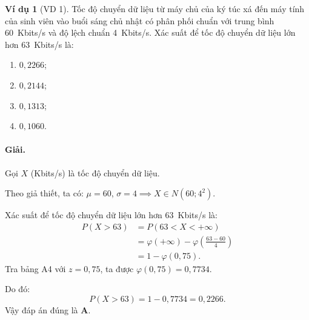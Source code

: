 \documentclass[12pt,a4paper]{article}
\theoremstyle{definition}
\newtheorem{vidu}{Ví dụ}[section]
\begin{document}
\begin{vidu}[VD 1]
Tốc độ chuyển dữ liệu từ máy chủ của ký túc xá đến máy tính của sinh viên vào buổi sáng chủ nhật có phân phối chuẩn với trung bình 60~Kbits/s và độ lệch chuẩn 4~Kbits/s. Xác suất để tốc độ chuyển dữ liệu lớn hơn 63~Kbits/s là:
\begin{enumerate}[label=\Alph*.]
    \item $0{,}2266$;
    \item $0{,}2144$;
    \item $0{,}1313$;
    \item $0{,}1060$.
\end{enumerate}

\paragraph{Giải.}
Gọi $X$ (Kbits/s) là tốc độ chuyển dữ liệu.

Theo giả thiết, ta có: $\mu = 60$, $\sigma = 4 \implies X \in N(60; 4^2)$.

Xác suất để tốc độ chuyển dữ liệu lớn hơn 63~Kbits/s là:
\begin{align*}
P(X > 63) &= P(63 < X < +\infty) \\
&= \varphi(+\infty) - \varphi\left(\frac{63 - 60}{4}\right) \\
&= 1 - \varphi(0{,}75).
\end{align*}
Tra bảng A4 với $z = 0{,}75$, ta được $\varphi(0{,}75) = 0{,}7734$.

Do đó:
\[
P(X > 63) = 1 - 0{,}7734 = 0{,}2266.
\]
Vậy đáp án đúng là \textbf{A}.
\end{vidu}
\end{document}
